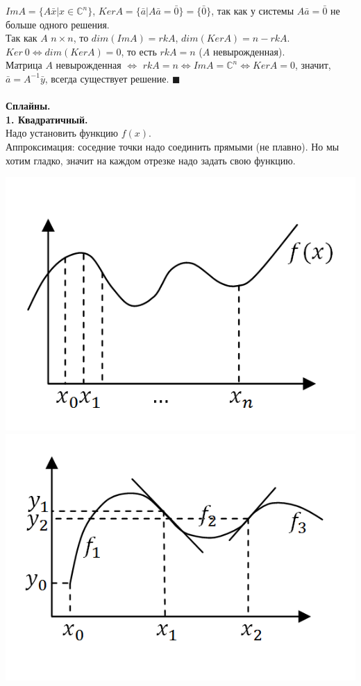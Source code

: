 \documentclass[12pt]{article}
\theoremstyle{definition}
\numberwithin{equation}{section}
\begin{document}
$Im A = \{ A \bar x | x\in \mathbb{C}^n \} $, 
$Ker A = \{\bar a | A \bar a = \bar 0 \} = \{\bar 0 \} $, так как у системы $A \bar a = \bar 0$ не больше одного решения.\\
Так как $A$ $n \times n$, то 
$dim(Im A) = rk A$, $dim(Ker A) = n-rk A$.\\ 
$Ker~ 0 \Leftrightarrow dim(Ker A) = 0$, то есть $rk A = n$ ($A$ невырожденная). \\
Матрица $A$ невырожденная $\Leftrightarrow$ $rk A = n \Leftrightarrow Im A = \mathbb{C}^n \Leftrightarrow Ker A = 0$, значит, $\bar a = A^{-1}\bar y$, всегда существует решение. $\blacksquare$\\
\\
\noindent \textbf{Сплайны.}\\
\noindent \textbf{1. Квадратичный.}\\
Надо установить функцию $f(x)$.\\
Аппроксимация: соседние точки надо соединить прямыми (не плавно). Но мы хотим гладко, значит на каждом отрезке надо задать свою функцию.\begin{center} \includegraphics[scale=0.6]{l3_3.png}\\
\includegraphics[scale=0.6]{l3_4.png}\end{center}
\end{document}
